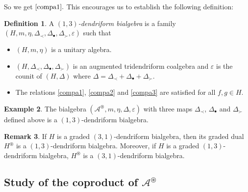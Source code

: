 \documentclass[10pt,a4paper]{amsart}
\numberwithin{equation}{section}
\theoremstyle{definition}
\newtheorem{defi}{Definition}[section]
\newtheorem{Eg}[defi]{Example}
\newtheorem{Rq}[defi]{Remark}
\theoremstyle{plain}
\begin{document}
So we get $\eqref{compa1}.$
This encourages us to establish the following definition:
\begin{defi}
	A \emph{$(1,3)$-dendriform bialgebra} is a family $(H,m,\eta,\Delta_{\prec},\Delta_{\bullet},\Delta_{\succ},\varepsilon)$
	such that
	\begin{itemize}\itemsep=0pt
		\item $(H,m,\eta)$ is a unitary algebra.
		\item $(H,\Delta_{\prec},\Delta_{\bullet},\Delta_{\succ})$ is an augmented tridendriform coalgebra and $\varepsilon$ is the counit of $(H,\Delta)$ where $\Delta=\Delta_{\prec}+\Delta_{\bullet}+\Delta_{\succ}.$
		\item The relations \eqref{compa1}, \eqref{compa2} and \eqref{compa3} are satisfied for all $f,g\in H.$
	\end{itemize}
\end{defi}
\begin{Eg}
	The bialgebra $(\mathcal{A}^{\circledast},m,\eta,\Delta,\varepsilon)$ with three maps $\Delta_{\prec}$, $\Delta_{\bullet}$ and $\Delta_{\succ}$ defined above is a $(1,3)$-dendriform bialgebra.
\end{Eg}
\begin{Rq}
	If $H$ is a graded $(3,1)$-dendriform bialgebra, then its graded dual $H^{\circledast}$ is a $(1,3)$-dendriform bialgebra. Moreover, if $H$ is a graded $(1,3)$-dendriform bialgebra, $H^{\circledast}$ is a $(3,1)$-dendriform bialgebra.
\end{Rq}

\subsection[Study of the coproduct of A\^{}\{circledast\}]{Study of the coproduct of $\boldsymbol{\mathcal{A}^{\circledast}}$}
\end{document}

